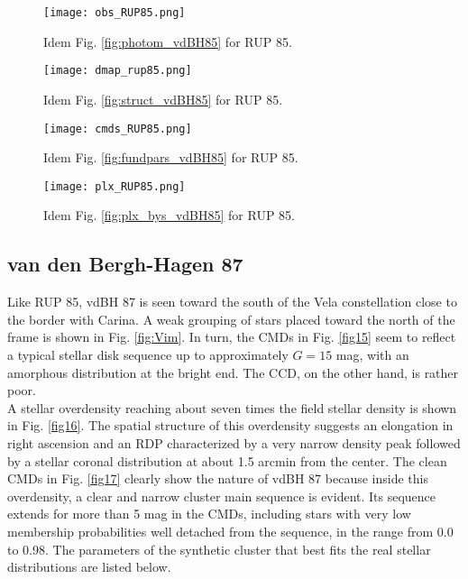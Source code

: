 \documentclass[draft]{aa}
\begin{document}
\begin{figure*}[ht]
    \centering
    \texttt{[image: obs\_RUP85.png]}
    \caption{Idem Fig. \ref{fig:photom_vdBH85} for RUP 85.}
    \label{fig7}
\end{figure*}

\begin{figure*}[ht]
    \centering
    \texttt{[image: dmap\_rup85.png]}
    \caption{Idem Fig. \ref{fig:struct_vdBH85} for RUP 85.}
    \label{fig8}
\end{figure*}

\begin{figure*}[ht]
    \centering
    \texttt{[image: cmds\_RUP85.png]}
    \caption{Idem Fig. \ref{fig:fundpars_vdBH85} for RUP 85.}
    \label{fig9}
\end{figure*}

\begin{figure*}[ht]
    \centering
    \texttt{[image: plx\_RUP85.png]}
    \caption{Idem Fig. \ref{fig:plx_bys_vdBH85} for RUP 85.}
    \label{fig10}
\end{figure*}





\subsection{van den Bergh-Hagen 87}

Like RUP 85, vdBH 87 is seen toward the south of the Vela constellation close to
the border with Carina. A weak grouping of stars placed toward the north of
the frame is shown in Fig. \ref{fig:Vim}. In turn, the CMDs in Fig. \ref{fig15}
seem to reflect a typical stellar disk sequence up to approximately $G=15$ mag,
with an amorphous distribution at the bright end. The CCD, on the other
hand, is rather poor.\\

A stellar overdensity reaching $\text{about seven}$ times the field stellar density is
shown in Fig. \ref{fig16}. The spatial structure of this overdensity suggests an
elongation in right ascension and an RDP characterized by a very narrow density
peak followed by a stellar coronal distribution at about 1.5 arcmin from the
center.
The clean CMDs in Fig. \ref{fig17} clearly show the nature of vdBH 87
because inside this overdensity, a clear and narrow cluster main
sequence is evident. Its sequence extends for more than 5 mag in the
CMDs, including stars with very low membership probabilities well detached
from the sequence, in the range from 0.0 to 0.98. The parameters of the
synthetic cluster that best fits the real stellar distributions are listed below.
\end{document}
